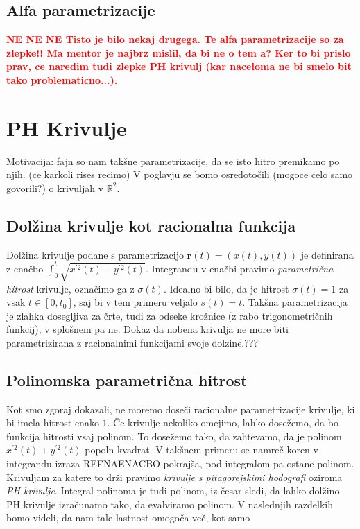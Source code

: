 \documentclass[isrm2, tisk]{fmfdelo}
\newcommand{\R}{\mathbb R}
\newcommand{\mycomment}[1]{\textbf{\textcolor{red}{#1}}}
\begin{document}
    \subsection{Alfa parametrizacije}
    \mycomment{NE
    NE
    NE
    Tisto je bilo nekaj drugega. Te alfa parametrizacije so za zlepke!! Ma mentor je najbrz mislil, da bi ne o tem a?
    Ker to bi prislo prav, ce naredim tudi zlepke PH krivulj (kar naceloma ne bi smelo bit tako problematicno...).
    }

    \newpage


    \section{PH Krivulje}
    Motivacija: fajn so nam takšne parametrizacije, da se isto hitro premikamo po njih. (ce karkoli rises recimo)
    V poglavju se bomo osredotočili (mogoce celo samo govorili?) o krivuljah v $\R^2$.

    \subsection{Dolžina krivulje kot racionalna funkcija}
    Dolžina krivulje podane s parametrizacijo  $\mathbf{r}(t) = \left(x(t),y(t)\right)$ je definirana z enačbo $\int_0^t \sqrt {x^{'2}(t)+y^{'2}(t)}$.
    Integrandu v enačbi pravimo \textit{parametrična hitrost} krivulje, označimo ga z $\sigma(t)$.
    Idealno bi bilo, da je hitrost $\sigma(t) = 1$ za vsak $t\in [0,t_0]$, saj bi v tem primeru veljalo $s(t)=t$.
    Takšna parametrizacija je zlahka dosegljiva za črte, tudi za odseke krožnice (z rabo trigonometričnih funkcij), v splošnem pa ne.
    Dokaz da nobena krivulja ne more biti parametrizirana z racionalnimi funkcijami svoje dolzine.???

    \subsection{Polinomska parametrična hitrost}
    Kot smo zgoraj dokazali, ne moremo doseči racionalne parametrizacije krivulje, ki bi imela hitrost enako $1$.
    Če krivulje nekoliko omejimo, lahko dosežemo, da bo funkcija hitrosti vsaj polinom.
    To dosežemo tako, da zahtevamo, da je polinom $x^{'2}(t)+y^{'2}(t)$ popoln kvadrat.
    V takšnem primeru se namreč koren v integrandu izraza REFNAENACBO pokrajša, pod integralom pa ostane polinom.
    Krivuljam za katere to drži pravimo \textit{krivulje s pitagorejskimi hodografi} oziroma \textit{PH krivulje}.
    Integral polinoma je tudi polinom, iz česar sledi, da lahko dolžino PH krivulje izračunamo tako, da evalviramo polinom.
    V naslednjih razdelkih bomo videli, da nam tale lastnost omogoča več, kot samo
\end{document}
